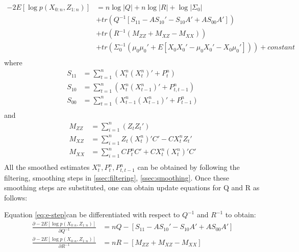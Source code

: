 \documentclass{article}
\begin{document}
\begin{equation}
\begin{split}\label{eq:e-step}
     -2E[\log p(X_{0:n},Z_{1:n})] &=n\log |Q|+n\log|R| + \log|\Sigma_0|\\
     &+ tr(Q^{-1}[S_{11}-AS_{10}'-S_{10}A'+AS_{00}A']) \\ 
 &+ tr(R^{-1}(M_{ZZ}+M_{XZ}-M_{XX}))\\
 &+ tr(\Sigma_0^{-1}(\mu_0\mu_0'+E[X_0X_0'-\mu_0X_0'-X_0\mu_0'])) +constant\\
\end{split}
\end{equation}
where
\begin{equation}\label{eq:s_calc}
\begin{split}
    S_{11} &= \sum_{t=1}^n(X_t^n(X_t^{n})'+P_t^n) \\
    S_{10} &= \sum_{t=1}^n(X_t^n(X_{t-1}^n)'+P_{t,t-1}^n) \\ 
    S_{00} &= \sum_{t=1}^n(X_{t-1}^n(X_{t-1}^n)'+P_{t-1}^n) \\
\end{split}
\end{equation}
and
\begin{equation}\label{eq:m_calc}
    \begin{split}
    M_{ZZ} &= \sum_{i=1}^n(Z_tZ_t')\\
    M_{XZ} &= \sum_{i=1}^n Z_t(X_t^n)'C'-CX_t^nZ_t'\\
    M_{XX} &= \sum_{i=1}^n CP_t^nC'+CX_t^n(X_t^n)'C'\\
    \end{split}
\end{equation}
All the smoothed estimates $X_t^n,P_t^n,P_{t,t-1}^n$ can be obtained by following the filtering, smoothing steps in \ref{ssec:filtering}, \ref{ssec:smoothing}. Once these smoothing steps are substituted, one can obtain update equations for Q and R as follows:

Equation \ref{eq:e-step}can be differentiated with respect to $Q^{-1}$ and $R^{-1}$ to obtain:
\begin{equation}
\begin{split}
\frac{\partial  -2E[\log p(X_{0:n},Z_{1:n})]}{\partial Q^{-1}} &= nQ -[S_{11}-AS_{10}'-S_{10}A'+AS_{00}A'] \\
\frac{\partial -2E[\log p(X_{0:n},Z_{1:n})]}{\partial R^{-1}} &= nR - [M_{ZZ}+M_{XZ}-M_{XX}]
\end{split}
\end{equation}
\end{document}
